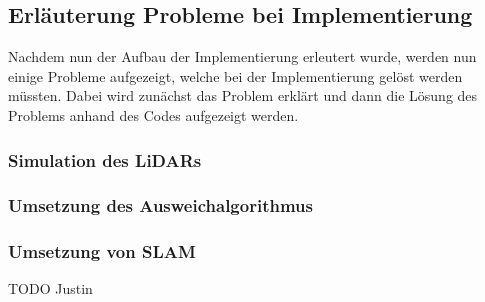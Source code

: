 \subsection{Erläuterung Probleme bei Implementierung}

Nachdem nun der Aufbau der Implementierung erleutert wurde, werden nun einige Probleme aufgezeigt, welche bei der Implementierung gelöst werden müssten. Dabei wird zunächst das Problem erklärt und dann die Lösung des Problems anhand des Codes aufgezeigt werden. 

\subsubsection{Simulation des LiDARs}


\subsubsection{Umsetzung des Ausweichalgorithmus}



\subsubsection{Umsetzung von SLAM}

TODO Justin

\newpage
